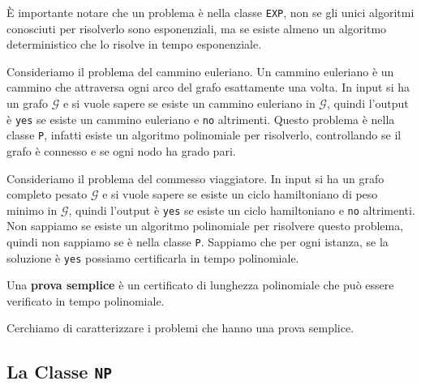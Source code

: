È importante notare che un problema è nella classe \texttt{EXP}, non se gli unici 
algoritmi conosciuti per risolverlo sono esponenziali, ma se esiste almeno un algoritmo
deterministico che lo risolve in tempo esponenziale.
\begin{exmp}
    Consideriamo il problema del cammino euleriano. Un cammino euleriano è un cammino che
    attraversa ogni arco del grafo esattamente una volta. 
    In input si ha un grafo $\mathcal{G}$ e si vuole sapere se esiste un cammino euleriano
    in $\mathcal{G}$, quindi l'output è \texttt{yes} se esiste un cammino euleriano e
    \texttt{no} altrimenti. 
    Questo problema è nella classe \texttt{P}, infatti esiste un algoritmo polinomiale
    per risolverlo, controllando se il grafo è connesso e se ogni nodo ha grado pari.
\end{exmp}
\begin{exmp}
    Consideriamo il problema del commesso viaggiatore. In input si ha un grafo completo
    pesato $\mathcal{G}$ e si vuole sapere se esiste un ciclo hamiltoniano di peso minimo
    in $\mathcal{G}$, quindi l'output è \texttt{yes} se esiste un ciclo hamiltoniano e
    \texttt{no} altrimenti. 
    Non sappiamo se esiste un algoritmo polinomiale per risolvere questo problema, quindi
    non sappiamo se è nella classe \texttt{P}. Sappiamo che per ogni istanza, se la soluzione 
    è \texttt{yes} possiamo certificarla in tempo polinomiale. 
\end{exmp}

\begin{tcolorbox}[title={Prova Semplice}]
    Una \textbf{prova semplice} è un certificato di lunghezza polinomiale che può essere
    verificato in tempo polinomiale. 
\end{tcolorbox}
Cerchiamo di caratterizzare i problemi che hanno una prova semplice.
\subsection{La Classe \texttt{NP}}

